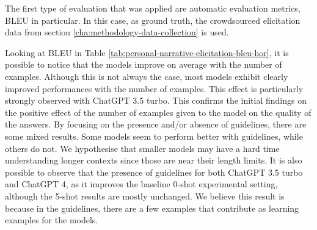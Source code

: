 % 
The first type of evaluation that was applied are automatic evaluation metrics,  BLEU \cite{bleu} in particular. In this case, as ground truth, the crowdsourced elicitation data from section \ref{cha:methodology-data-collection} is used.
% 

% 
% 
Looking at BLEU in Table \ref{tab:personal-narrative-elicitation-bleu-hor}, it is possible to notice that the models improve on average with the number of examples. Although this is not always the case, most models exhibit clearly improved performances with the number of examples. This effect is particularly strongly observed with ChatGPT 3.5 turbo. This confirms the initial findings on the positive effect of the number of examples given to the model on the quality of the answers. 
By focusing on the presence and/or absence of guidelines, there are some mixed results. Some models seem to perform better with guidelines, while others do not. We hypothesise that smaller models may have a hard time understanding longer contexts since those are near their length limits. 
It is also possible to observe that the presence of guidelines for both ChatGPT 3.5 turbo and ChatGPT 4, as it improves the baseline 0-shot experimental setting, although the 5-shot results are mostly unchanged. We believe this result is because in the guidelines, there are a few examples that contribute as learning examples for the models. 

